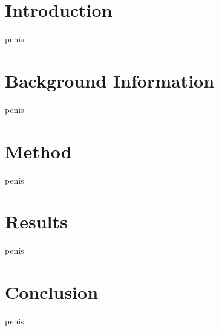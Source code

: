 \documentclass[11pt]{article}
\begin{document}
\section{Introduction}
penis

\section{Background Information}
penis

\section{Method}
penis

\section{Results}
penis

\section{Conclusion}
penis
\end{document}
